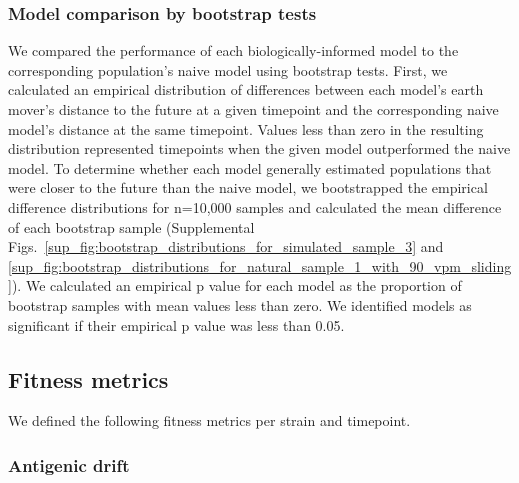\subsubsection*{Model comparison by bootstrap tests}

We compared the performance of each biologically-informed model to the corresponding population's naive model using bootstrap tests.
First, we calculated an empirical distribution of differences between each model's earth mover's distance to the future at a given timepoint and the corresponding naive model's distance at the same timepoint.
Values less than zero in the resulting distribution represented timepoints when the given model outperformed the naive model.
To determine whether each model generally estimated populations that were closer to the future than the naive model, we bootstrapped the empirical difference distributions for n=10,000 samples and calculated the mean difference of each bootstrap sample (Supplemental Figs.~\ref{sup_fig:bootstrap_distributions_for_simulated_sample_3} and \ref{sup_fig:bootstrap_distributions_for_natural_sample_1_with_90_vpm_sliding}).
We calculated an empirical p value for each model as the proportion of bootstrap samples with mean values less than zero.
We identified models as significant if their empirical p value was less than 0.05.

\subsection*{Fitness metrics}

We defined the following fitness metrics per strain and timepoint.

\subsubsection*{Antigenic drift}

